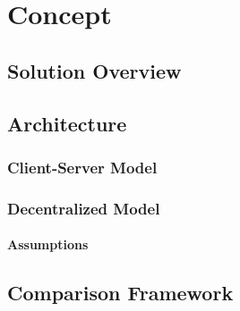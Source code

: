 
\chapter{Concept}

\section{Solution Overview}

\section{Architecture}
	\subsection{Client-Server Model}
	\subsection{Decentralized Model}
		\subsubsection{Assumptions}
		
\section{Comparison Framework}